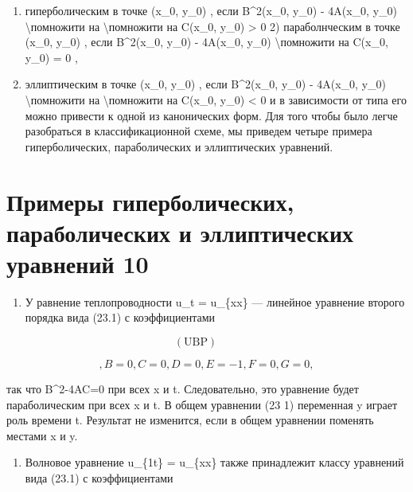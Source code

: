 \documentclass[
]{article}
\providecommand{\tightlist}{%
  \setlength{\itemsep}{0pt}\setlength{\parskip}{0pt}}
\begin{document}
\begin{enumerate}
\def\labelenumi{\arabic{enumi})}
\item
  гиперболическим в точке (x\_0, y\_0) , если B\^{}2(x\_0, y\_0) -
  4A(x\_0, y\_0) \textbackslash помножити на \textbackslash помножити на
  C(x\_0, y\_0) \textgreater{} 0 2) параболнческим в точке (x\_0, y\_0)
  , если B\^{}2(x\_0, y\_0) - 4A(x\_0, y\_0) \textbackslash помножити на
  C(x\_0, y\_0) = 0 ,
\item
  эллиптическим в точке (x\_0, y\_0) , если B\^{}2(x\_0, y\_0) -
  4A(x\_0, y\_0) \textbackslash помножити на \textbackslash помножити на
  C(x\_0, y\_0) \textless{} 0 и в зависимости от типа его можно привести
  к одной из канонических форм. Для того чтобы было легче разобраться в
  классификационной схеме, мы приведем четыре примера гиперболических,
  параболических и эллиптических уравнений.
\end{enumerate}

\section{Примеры гиперболических, параболических и эллиптических
уравнений
10}\label{ux43fux440ux438ux43cux435ux440ux44b-ux433ux438ux43fux435ux440ux431ux43eux43bux438ux447ux435ux441ux43aux438ux445-ux43fux430ux440ux430ux431ux43eux43bux438ux447ux435ux441ux43aux438ux445-ux438-ux44dux43bux43bux438ux43fux442ux438ux447ux435ux441ux43aux438ux445-ux443ux440ux430ux432ux43dux435ux43dux438ux439-10}

\begin{enumerate}
\def\labelenumi{\arabic{enumi}.}
\tightlist
\item
  У равнение теплопроводности u\_t = u\_\{xx\} --- линейное уравнение
  второго порядка вида (23.1) с коэффициентами
\end{enumerate}

\[
(\text{UBP}) \qquad
\]

\[
,   B=0  ,   C=0  ,   D=0  ,   E=-1  ,   F=0  ,   G=0  ,
\]

так что B\^{}2-4AC=0 при всех x и t. Следовательно, это уравнение будет
параболическим при всех x и t. В общем уравнении (23 1) переменная y
играет роль времени t. Результат не изменится, если в общем уравнении
поменять местами x и y.

\begin{enumerate}
\def\labelenumi{\arabic{enumi}.}
\setcounter{enumi}{1}
\tightlist
\item
  Волновое уравнение u\_\{1t\} = u\_\{xx\} также принадлежит классу
  уравнений вида (23.1) с коэффициентами
\end{enumerate}
\end{document}
